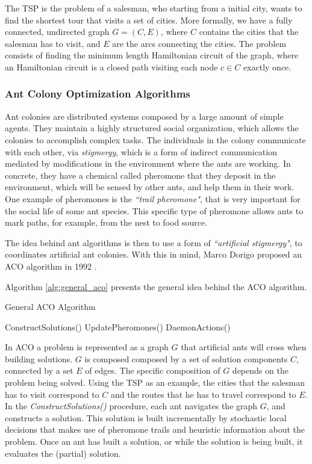 		The TSP is the problem of a salesman, who starting from a initial city, wants to find the shortest tour that visits a set of cities. More formally, we have a fully connected, undirected graph $G=(C,E)$, where $C$ contains the cities that the salesman has to visit, and $E$ are the arcs connecting the cities. The problem consists of finding the minimum length Hamiltonian circuit of the graph, where an Hamiltonian circuit is a closed path visiting each node $c \in C$ exactly once.
		\subsubsection*{Ant Colony Optimization Algorithms}
		\label{subsubsec:ant_algorithms}

		Ant colonies are distributed systems \cite{acobook} composed by a large amount of simple agents. They maintain a highly structured social organization, which allows the colonies to accomplish complex tasks. The individuals in the colony communicate with each other, via \emph{stigmergy}, which is a form of indirect communication mediated by modifications in the environment where the ants are working. In concrete, they have a chemical called pheromone that they deposit in the environment, which will be sensed by other ants, and help them in their work. One example of pheromones is the \emph{``trail pheromone"}, that is very important for the social life of some ant species. This specific type of pheromone allows ants to mark paths, for example, from the nest to food source.
	
		The idea behind ant algorithms is then to use a form of \emph{``artificial stigmergy"}, to coordinates artificial ant colonies. With this in mind, Marco Dorigo proposed an ACO algorithm in 1992 \cite{dorigo92}. 	

		Algorithm \ref{alg:general_aco} presents the general idea behind the ACO algorithm.
				\begin{algorithm}
					\caption{General ACO Algorithm}
					\label{alg:general_aco}
					\begin{algorithmic}
						\STATE ConstructSolutions()
						\STATE UpdatePheromones() 
						\STATE DaemonActions() 
					\ENDWHILE
					\end{algorithmic}
				\end{algorithm}
				
				In ACO a problem is represented as a graph $G$ that artificial ants will cross when building solutions. $G$ is composed composed by a set of solution components $C$, connected by a set $E$ of edges. The specific composition of $G$ depends on the problem being solved.
				 Using the TSP as an example, the cities that the salesman has to visit correspond to $C$ and the routes that he has to travel correspond to $E$.			
				In the \emph{ConstructSolutions()} procedure, each ant navigates the graph $G$, and constructs a solution. This solution is built incrementally by stochastic local decisions that makes use of pheromone trails and heuristic information about the problem. Once an ant has built a solution, or while the solution is being built, it evaluates the (partial) solution.
				
